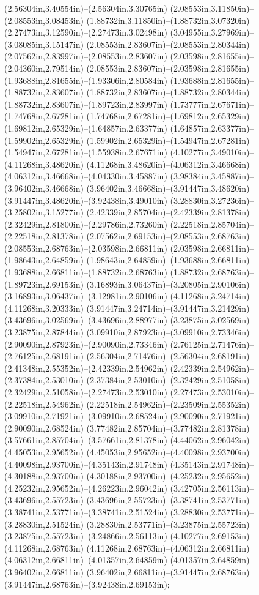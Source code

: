 (2.56304in,3.40554in)--(2.56304in,3.30765in) (2.08553in,3.11850in)--(2.08553in,3.08453in) (1.88732in,3.11850in)--(1.88732in,3.07320in) (2.27473in,3.12590in)--(2.27473in,3.02498in) (3.04955in,3.27969in)--(3.08085in,3.15147in) (2.08553in,2.83607in)--(2.08553in,2.80344in) (2.07562in,2.83997in)--(2.08553in,2.83607in) (2.03598in,2.81655in)--(2.04360in,2.79514in) (2.08553in,2.83607in)--(2.03598in,2.81655in) (1.93688in,2.81655in)--(1.93306in,2.80584in) (1.93688in,2.81655in)--(1.88732in,2.83607in) (1.88732in,2.83607in)--(1.88732in,2.80344in) (1.88732in,2.83607in)--(1.89723in,2.83997in) (1.73777in,2.67671in)--(1.74768in,2.67281in) (1.74768in,2.67281in)--(1.69812in,2.65329in) (1.69812in,2.65329in)--(1.64857in,2.63377in) (1.64857in,2.63377in)--(1.59902in,2.65329in) (1.59902in,2.65329in)--(1.54947in,2.67281in) (1.54947in,2.67281in)--(1.55938in,2.67671in) (4.10277in,3.49010in)--(4.11268in,3.48620in) (4.11268in,3.48620in)--(4.06312in,3.46668in) (4.06312in,3.46668in)--(4.04330in,3.45887in) (3.98384in,3.45887in)--(3.96402in,3.46668in) (3.96402in,3.46668in)--(3.91447in,3.48620in) (3.91447in,3.48620in)--(3.92438in,3.49010in) (3.28830in,3.27236in)--(3.25802in,3.15277in) (2.42339in,2.85704in)--(2.42339in,2.81378in) (2.32429in,2.81800in)--(2.29786in,2.73260in) (2.22518in,2.85704in)--(2.22518in,2.81378in) (2.07562in,2.69153in)--(2.08553in,2.68763in) (2.08553in,2.68763in)--(2.03598in,2.66811in) (2.03598in,2.66811in)--(1.98643in,2.64859in) (1.98643in,2.64859in)--(1.93688in,2.66811in) (1.93688in,2.66811in)--(1.88732in,2.68763in) (1.88732in,2.68763in)--(1.89723in,2.69153in) (3.16893in,3.06437in)--(3.20805in,2.90106in) (3.16893in,3.06437in)--(3.12981in,2.90106in) (4.11268in,3.24714in)--(4.11268in,3.20333in) (3.91447in,3.24714in)--(3.91447in,3.21429in) (3.43696in,3.02569in)--(3.43696in,2.88977in) (3.23875in,3.02569in)--(3.23875in,2.87844in) (3.09910in,2.87923in)--(3.09910in,2.73346in) (2.90090in,2.87923in)--(2.90090in,2.73346in) (2.76125in,2.71476in)--(2.76125in,2.68191in) (2.56304in,2.71476in)--(2.56304in,2.68191in) (2.41348in,2.55352in)--(2.42339in,2.54962in) (2.42339in,2.54962in)--(2.37384in,2.53010in) (2.37384in,2.53010in)--(2.32429in,2.51058in) (2.32429in,2.51058in)--(2.27473in,2.53010in) (2.27473in,2.53010in)--(2.22518in,2.54962in) (2.22518in,2.54962in)--(2.23509in,2.55352in) (3.09910in,2.71921in)--(3.09910in,2.68524in) (2.90090in,2.71921in)--(2.90090in,2.68524in) (3.77482in,2.85704in)--(3.77482in,2.81378in) (3.57661in,2.85704in)--(3.57661in,2.81378in) (4.44062in,2.96042in)--(4.45053in,2.95652in) (4.45053in,2.95652in)--(4.40098in,2.93700in) (4.40098in,2.93700in)--(4.35143in,2.91748in) (4.35143in,2.91748in)--(4.30188in,2.93700in) (4.30188in,2.93700in)--(4.25232in,2.95652in) (4.25232in,2.95652in)--(4.26223in,2.96042in) (3.42705in,2.56113in)--(3.43696in,2.55723in) (3.43696in,2.55723in)--(3.38741in,2.53771in) (3.38741in,2.53771in)--(3.38741in,2.51524in) (3.28830in,2.53771in)--(3.28830in,2.51524in) (3.28830in,2.53771in)--(3.23875in,2.55723in) (3.23875in,2.55723in)--(3.24866in,2.56113in) (4.10277in,2.69153in)--(4.11268in,2.68763in) (4.11268in,2.68763in)--(4.06312in,2.66811in) (4.06312in,2.66811in)--(4.01357in,2.64859in) (4.01357in,2.64859in)--(3.96402in,2.66811in) (3.96402in,2.66811in)--(3.91447in,2.68763in) (3.91447in,2.68763in)--(3.92438in,2.69153in);
